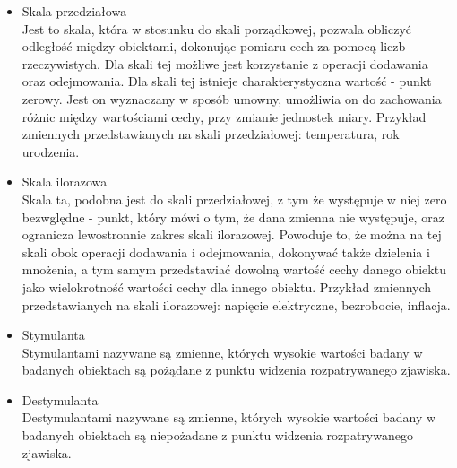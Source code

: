 \documentclass[12pt,a4paper]{report}
\begin{document}
\begin{itemize}
\item Skala przedziałowa \cite[Rozdział 1.2]{panek2013}\\
Jest to skala, która w stosunku do skali porządkowej, pozwala obliczyć odległość między obiektami, dokonując pomiaru cech za pomocą liczb rzeczywistych. Dla skali tej możliwe jest korzystanie z operacji dodawania oraz odejmowania. Dla skali tej istnieje charakterystyczna wartość - punkt zerowy. Jest on wyznaczany w sposób umowny, umożliwia on do zachowania różnic między wartościami cechy, przy zmianie jednostek miary. Przykład zmiennych przedstawianych na skali przedziałowej: temperatura, rok urodzenia.\\ %

\item Skala ilorazowa \cite[Rozdział 1.2]{panek2013}\\
Skala ta, podobna jest do skali przedziałowej, z tym że występuje w niej zero bezwględne - punkt, który mówi o tym, że dana zmienna nie występuje, oraz ogranicza lewostronnie zakres skali ilorazowej. Powoduje to, że można na tej skali obok operacji dodawania i odejmowania, dokonywać także dzielenia i mnożenia, a tym samym przedstawiać dowolną wartość cechy danego obiektu jako wielokrotność wartości cechy dla innego obiektu. Przykład zmiennych przedstawianych na skali ilorazowej: napięcie elektryczne, bezrobocie, inflacja.\\


\item Stymulanta \cite[Rozdział 1.5]{panek2013}\\
Stymulantami nazywane są zmienne, których wysokie wartości badany w badanych obiektach są pożądane z punktu widzenia rozpatrywanego zjawiska.\\

\item Destymulanta \cite[Rozdział 1.5]{panek2013}\\
Destymulantami nazywane są zmienne, których wysokie wartości badany w badanych obiektach są niepożadane z punktu widzenia rozpatrywanego zjawiska.\\


\end{itemize}
\end{document}
